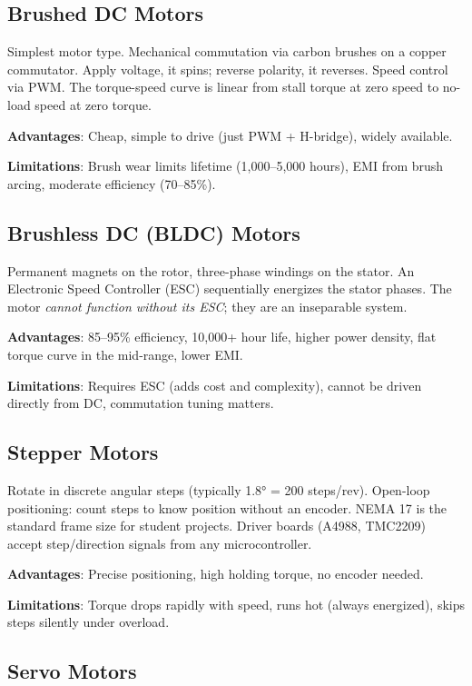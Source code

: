 \subsection{Brushed DC Motors}

Simplest motor type. Mechanical commutation via carbon brushes on a copper commutator. Apply voltage, it spins; reverse polarity, it reverses. Speed control via PWM. The torque-speed curve is linear from stall torque at zero speed to no-load speed at zero torque.

\textbf{Advantages}: Cheap, simple to drive (just PWM + H-bridge), widely available.

\textbf{Limitations}: Brush wear limits lifetime (1,000--5,000 hours), EMI from brush arcing, moderate efficiency (70--85\%).

\subsection{Brushless DC (BLDC) Motors}

Permanent magnets on the rotor, three-phase windings on the stator. An Electronic Speed Controller (ESC) sequentially energizes the stator phases. The motor \emph{cannot function without its ESC}; they are an inseparable system.

\textbf{Advantages}: 85--95\% efficiency, 10,000+ hour life, higher power density, flat torque curve in the mid-range, lower EMI.

\textbf{Limitations}: Requires ESC (adds cost and complexity), cannot be driven directly from DC, commutation tuning matters.

\subsection{Stepper Motors}

Rotate in discrete angular steps (typically \ang{1.8} = 200 steps/rev). Open-loop positioning: count steps to know position without an encoder. NEMA 17 is the standard frame size for student projects. Driver boards (A4988, TMC2209) accept step/direction signals from any microcontroller.

\textbf{Advantages}: Precise positioning, high holding torque, no encoder needed.

\textbf{Limitations}: Torque drops rapidly with speed, runs hot (always energized), skips steps silently under overload.

\subsection{Servo Motors}

